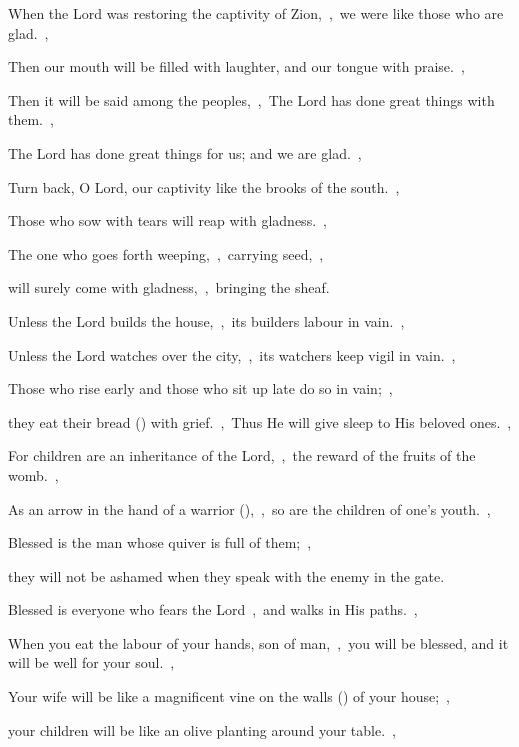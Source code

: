 \documentclass[12pt,twoside,a5paper]{article}
\begin{document}
\begin{halfparskip}
   When the Lord was restoring the captivity of Zion,~\sep\ we were like those who are glad.~\sep


  Then our mouth will be filled with laughter, and our tongue with praise.~\sep

  Then it will be said among the peoples,~\sep\ The Lord has done great things with them.~\sep

  The Lord has done great things for us; and we are glad.~\sep

  Turn back, O Lord, our captivity like the brooks of the south.~\sep

  Those who sow with tears will reap with gladness.~\sep

  The one who goes forth weeping,~\sep\ carrying seed,~\sep

  will surely come with gladness,~\sep\ bringing the sheaf.

   Unless the Lord builds the house,~\sep\ its builders labour in vain.~\sep

  Unless the Lord watches over the city,~\sep\ its watchers keep vigil in vain.~\sep

  Those who rise early and those who sit up late do so in vain;~\sep

  they eat their bread () with grief.~\sep\ Thus He will give sleep to His beloved ones.~\sep

  For children are an inheritance of the Lord,~\sep\ the reward of the fruits of the womb.~\sep

  As an arrow in the hand of a warrior (),~\sep\ so are the children of one's youth.~\sep

  Blessed is the man whose quiver is full of them;~\sep

  they will not be ashamed when they speak with the enemy in the gate.

   Blessed is everyone who fears the Lord~\sep\ and walks in His paths.~\sep

  When you eat the labour of your hands, son of man,~\sep\ you will be blessed, and it will be well for your soul.~\sep

  Your wife will be like a magnificent vine on the walls () of your house;~\sep

  your children will be like an olive planting around your table.~\sep


\end{halfparskip}
\end{document}
